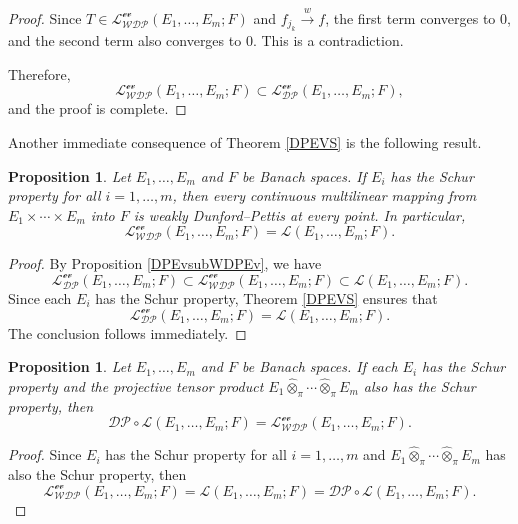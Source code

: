 \documentclass[12 pt]{article}%
\newtheorem{proposition}[theorem]{Proposition}
\newtheorem{final remark}[theorem]{Final Remark}
\begin{document}
\begin{proof}
	Since $T \in \mathcal{L_{WDP}^{\text{ev}}}(E_1,\dots, E_m; F)$ and $f_{j_k} \overset{w}{\longrightarrow} f$, the first term converges to $0$, and the second term also converges to $0$. This is a contradiction.
	
	Therefore,
	\[
	\mathcal{L_{WDP}^{\text{ev}}}(E_1,\dots, E_m; F) \subset \mathcal{L_{DP}^{\text{ev}}}(E_1,\dots, E_m; F),
	\]
	and the proof is complete.
\end{proof}

Another immediate consequence of Theorem \ref{DPEVS} is the following result.

\begin{proposition}
	Let $E_1,\dots, E_m$ and $F$ be Banach spaces. If $E_i$ has the Schur property for all $i=1,\dots, m$, then every continuous multilinear mapping from $E_1\times\cdots\times E_m$ into $F$ is weakly Dunford--Pettis at every point. In particular,
	\[
	\mathcal{L_{WDP}^{\text{ev}}}(E_1,\dots, E_m; F) = \mathcal{L}(E_1,\dots, E_m; F).
	\]
\end{proposition}

\begin{proof}
	By Proposition \ref{DPEvsubWDPEv}, we have
	\[
	\mathcal{L_{DP}^{\text{ev}}}(E_1,\dots, E_m; F)
	\subset 
	\mathcal{L_{WDP}^{\text{ev}}}(E_1,\dots, E_m; F)
	\subset 
	\mathcal{L}(E_1,\dots, E_m; F).
	\]
	Since each $E_i$ has the Schur property, Theorem \ref{DPEVS} ensures that
	\[
	\mathcal{L_{DP}^{\text{ev}}}(E_1,\dots, E_m; F)
	=
	\mathcal{L}(E_1,\dots, E_m; F).
	\]
	The conclusion follows immediately.
\end{proof}

\begin{proposition}
	Let $E_1,\dots, E_m$ and $F$ be Banach spaces. If each $E_i$ has the Schur property and the projective tensor product $E_1 \hat{\otimes}_{\pi} \cdots \hat{\otimes}_{\pi} E_m$ also has the Schur property, then
	\[
	\mathcal{DP} \circ \mathcal{L}(E_1,\dots, E_m; F)
	=
	\mathcal{L_{WDP}^{\text{ev}}}(E_1,\dots, E_m; F).
	\]
\end{proposition}
\begin{proof}
	Since $E_i$ has the Schur property for all $i=1,\dots, m$ and $E_1 \hat{\otimes}_{\pi} \cdots \hat{\otimes}_{\pi} E_m$ has also the Schur property, then
	\begin{equation*}
		\mathcal{L_{WDP}^{\text{ev}}}(E_1,\dots, E_m; F) = \mathcal{L}(E_1,\dots, E_m; F) = \mathcal{DP} \circ \mathcal{L}(E_1,\dots, E_m; F).
	\end{equation*}
\end{proof}
\end{document}
